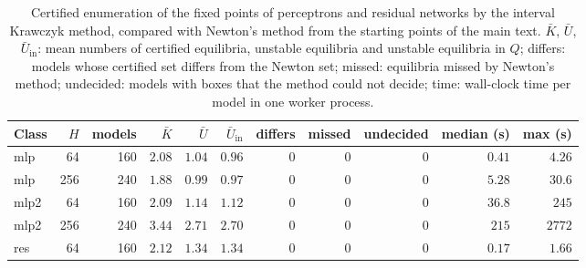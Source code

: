 \begin{table}
\caption{Certified enumeration of the fixed points of perceptrons and residual networks by the interval Krawczyk method,
compared with Newton's method from the starting points of the main text. $\bar K$, $\bar U$, $\bar U_{\mathrm{in}}$: mean
numbers of certified equilibria, unstable equilibria and unstable equilibria in $Q$; differs: models whose certified set
differs from the Newton set; missed: equilibria missed by Newton's method; undecided: models with boxes that the method
could not decide; time: wall-clock time per model in one worker process.}
\label{tab:sm_cert}
\begin{ruledtabular}
\begin{tabular}{lrrrrrrrrrr}
Class & $H$ & models & $\bar K$ & $\bar U$ & $\bar U_{\mathrm{in}}$ & differs & missed & undecided & median (s) & max (s) \\
\hline
mlp & 64 & 160 & $2.08$ & $1.04$ & $0.96$ & 0 & 0 & 0 & $0.41$ & $4.26$ \\
mlp & 256 & 240 & $1.88$ & $0.99$ & $0.97$ & 0 & 0 & 0 & $5.28$ & $30.6$ \\
mlp2 & 64 & 160 & $2.09$ & $1.14$ & $1.12$ & 0 & 0 & 0 & $36.8$ & $245$ \\
mlp2 & 256 & 240 & $3.44$ & $2.71$ & $2.70$ & 0 & 0 & 0 & $215$ & $2772$ \\
res\footnotemark[1] & 64 & 160 & $2.12$ & $1.34$ & $1.34$ & 0 & 0 & 0 & $0.17$ & $1.66$ \\
\end{tabular}
\end{ruledtabular}
\end{table}
